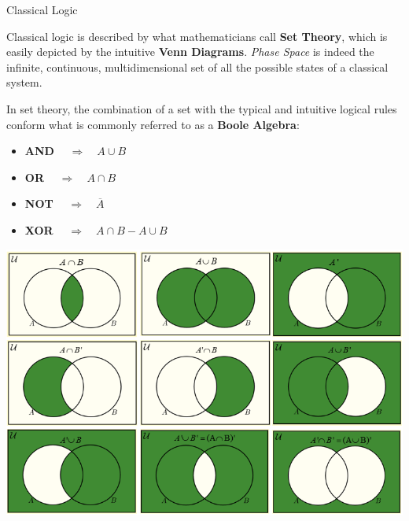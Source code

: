 \documentclass[9pt, handout, aspectratio=169]{beamer}		%
\begin{document}
	\begin{frame}{Classical Logic}
		
		Classical logic is described by what mathematicians call \textbf{Set Theory}, which is easily depicted by the intuitive \textbf{Venn Diagrams}. \emph{Phase Space} is indeed the infinite, continuous, multidimensional set of all the possible states of a classical system.
		
		\medskip
		
		In set theory, the combination of a set with the typical and intuitive logical rules conform what is commonly referred to as a \textbf{Boole Algebra}:
		
		\begin{multicols}{2}
		
		\begin{itemize}
			\item \textbf{AND} $\quad \Rightarrow \quad A \cup B$
			\item \textbf{OR} $\quad \Rightarrow \quad A \cap B$
			\item \textbf{NOT} $\quad \Rightarrow \quad \overline{A}$
			\item \textbf{XOR} $ \quad \Rightarrow \quad A \cap B - A \cup B$
		\end{itemize}
		
			\columnbreak
			\begin{center}
		\includegraphics[width=.34\paperwidth]{Figures/Venn_Diagrams}
			\end{center}
		
		\end{multicols}
		
	\end{frame}
	
\end{document}
